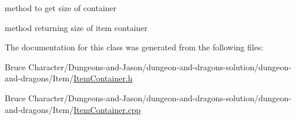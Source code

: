 method to get size of container 

method returning size of item container 

The documentation for this class was generated from the following files\+:\begin{DoxyCompactItemize}
\item 
Bruce Character/\+Dungeons-\/and-\/\+Jason/dungeon-\/and-\/dragons-\/solution/dungeon-\/and-\/dragons/\+Item/\hyperlink{_item_container_8h}{Item\+Container.\+h}\item 
Bruce Character/\+Dungeons-\/and-\/\+Jason/dungeon-\/and-\/dragons-\/solution/dungeon-\/and-\/dragons/\+Item/\hyperlink{_item_container_8cpp}{Item\+Container.\+cpp}\end{DoxyCompactItemize}
